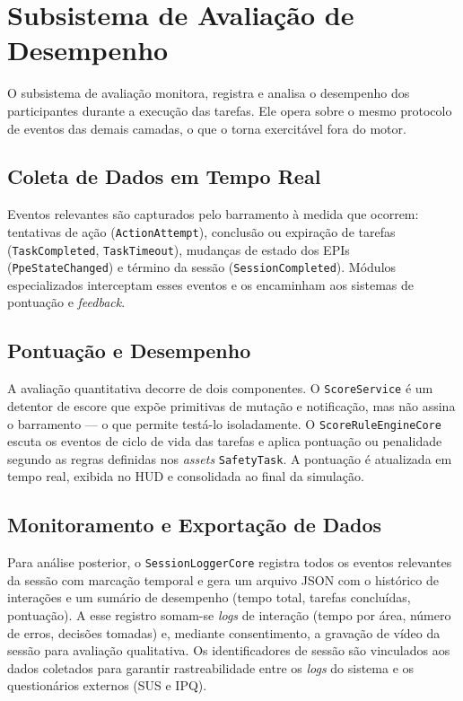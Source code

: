 \section{Subsistema de Avaliação de Desempenho}

O subsistema de avaliação monitora, registra e analisa o desempenho dos participantes durante a execução das tarefas. Ele opera sobre o mesmo protocolo de eventos das demais camadas, o que o torna exercitável fora do motor.

\subsection{Coleta de Dados em Tempo Real}

Eventos relevantes são capturados pelo barramento à medida que ocorrem: tentativas de ação (\texttt{ActionAttempt}), conclusão ou expiração de tarefas (\texttt{TaskCompleted}, \texttt{TaskTimeout}), mudanças de estado dos EPIs (\texttt{PpeStateChanged}) e término da sessão (\texttt{SessionCompleted}). Módulos especializados interceptam esses eventos e os encaminham aos sistemas de pontuação e \textit{feedback}.

\subsection{Pontuação e Desempenho}

A avaliação quantitativa decorre de dois componentes. O \texttt{ScoreService} é um detentor de escore que expõe primitivas de mutação e notificação, mas não assina o barramento --- o que permite testá-lo isoladamente. O \texttt{ScoreRuleEngineCore} escuta os eventos de ciclo de vida das tarefas e aplica pontuação ou penalidade segundo as regras definidas nos \textit{assets} \texttt{SafetyTask}. A pontuação é atualizada em tempo real, exibida no HUD e consolidada ao final da simulação.

\subsection{Monitoramento e Exportação de Dados}

Para análise posterior, o \texttt{SessionLoggerCore} registra todos os eventos relevantes da sessão com marcação temporal e gera um arquivo \gls{JSON} com o histórico de interações e um sumário de desempenho (tempo total, tarefas concluídas, pontuação). A esse registro somam-se \textit{logs} de interação (tempo por área, número de erros, decisões tomadas) e, mediante consentimento, a gravação de vídeo da sessão para avaliação qualitativa. Os identificadores de sessão são vinculados aos dados coletados para garantir rastreabilidade entre os \textit{logs} do sistema e os questionários externos (SUS e IPQ).

